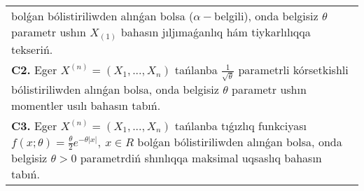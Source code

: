 \documentclass{article}
\begin{document}
\begin{tabular}{m{17cm}}
bolǵan bólistiriliwden alınǵan bolsa (\(\alpha -\)belgili), onda belgisiz \(\theta\) parametr ushın \(X_{(1)}\) bahasın jıljımaǵanlıq hám tiykarlılıqqa tekseriń.
 \\
\textbf{C2.} 
Eger \(X^{(n)} = \left( X_{1},...,X_{n} \right)\) tańlanba \(\frac{1}{\sqrt{\theta}}\) parametrli kórsetkishli bólistiriliwden alınǵan bolsa, onda belgisiz \(\theta\) parametr ushın momentler usılı bahasın tabıń.
 \\
\textbf{C3.} 
Eger \(X^{(n)} = \left( X_{1},...,X_{n} \right)\) tańlanba tıǵızlıq funkciyası
$f(x;\theta) = \frac{\theta}{2}e^{- \theta|x|},\ x \in R$
bolǵan bólistiriliwden alınǵan bolsa, onda belgisiz \(\theta > 0\) parametrdiń shınlıqqa maksimal uqsaslıq bahasın tabıń.
 \\

\end{tabular}
\vspace{1cm}
\end{document}
